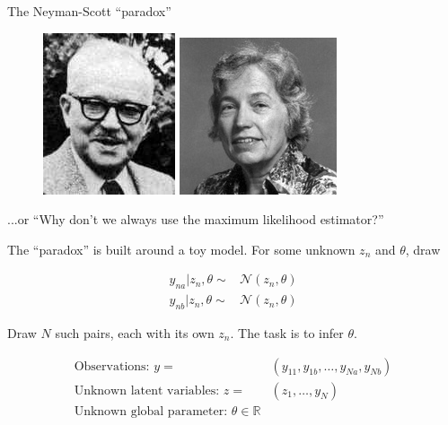 

\begin{frame}{The Neyman-Scott ``paradox''}
\begin{figure}
    \centering
    \includegraphics[height=0.2\textwidth]{static_images/neyman.jpg}
    \includegraphics[height=0.2\textwidth]{static_images/ElizabethScott.jpg}
\end{figure}

...or ``Why don't we always use the maximum likelihood estimator?''

The ``paradox'' is built around a toy model.  For some unknown $z_n$ and $\theta$, draw

\begin{align*}
    y_{na} | z_n, \theta \sim{}& \mathcal{N}(z_n, \theta)\\
    y_{nb} | z_n, \theta \sim{}& \mathcal{N}(z_n, \theta)
\end{align*}

Draw $N$ such pairs, each with its own $z_n$.  The task is to infer $\theta$.

\pause

\begin{align*}
    \textrm{Observations: }y ={}& (y_{11}, y_{1b}, \ldots, y_{Na}, y_{Nb})\\
    \textrm{Unknown latent variables: }z ={}& (z_1, \ldots, y_N)\\
    \textrm{Unknown global parameter: }\theta \in \mathbb{R}
\end{align*}

\end{frame}



